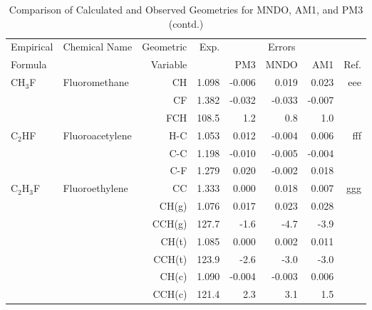 \begin{table}
\caption{\label{geotabh}Comparison of Calculated and Observed Geometries for 
MNDO, AM1, and PM3 (contd.)}
\begin{center}
\compresstable
\begin{tabular}{llrrrrrr}
 Empirical  & Chemical Name &  Geometric &  Exp. & \multicolumn{3}{c}{Errors} & \\
  Formula   &               &  Variable &        & PM3  & MNDO  &  AM1 & Ref.\\
\hline
 CH$_3$F        & Fluoromethane                      &CH            &     1.098   &    -0.006 &     0.019 &     0.023 &   eee \\
             &                                    &CF            &     1.382   &    -0.032 &    -0.033 &    -0.007 &       \\
             &                                    &FCH         &     108.5   &       1.2 &       0.8 &       1.0   &       \\
 C$_2$HF        & Fluoroacetylene                    &H-C           &     1.053   &     0.012 &    -0.004 &     0.006 &   fff \\
             &                                    &C-C           &     1.198   &    -0.010 &    -0.005 &    -0.004 &       \\
             &                                    &C-F           &     1.279   &     0.020 &    -0.002 &     0.018 &       \\
 C$_2$H$_3$F       & Fluoroethylene                     &CC            &     1.333   &     0.000 &     0.018 &     0.007 &   ggg \\
             &                                    &CH(g)         &     1.076   &     0.017 &     0.023 &     0.028 &       \\
             &                                    &CCH(g)      &     127.7   &      -1.6 &      -4.7 &      -3.9   &       \\
             &                                    &CH(t)         &     1.085   &     0.000 &     0.002 &     0.011 &       \\
             &                                    &CCH(t)      &     123.9   &      -2.6 &      -3.0 &      -3.0   &       \\
             &                                    &CH(c)         &     1.090   &    -0.004 &    -0.003 &     0.006 &       \\
             &                                    &CCH(c)      &     121.4   &       2.3 &       3.1 &       1.5   &       \\

\end{tabular}
\end{center}
\end{table}
